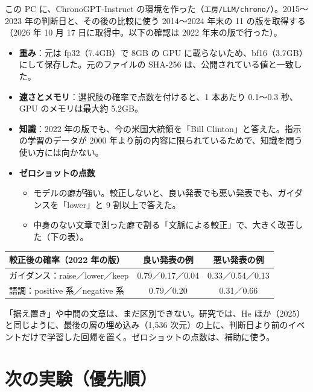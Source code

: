 \documentclass[xelatex,ja=standard,jafont=haranoaji,a4paper,10pt]{bxjsarticle}
\newcommand{\code}[1]{\texttt{#1}}
\begin{document}
この PC に、ChronoGPT-Instruct の環境を作った（\code{工房/LLM/chrono/}）。2015〜2023 年の判断日と、その後の比較に使う 2014〜2024 年末の 11 の版を取得する（2026 年 10 月 17 日に取得中。以下の確認は 2022 年末の版で行った）。

\begin{itemize}
\item \textbf{重み}：元は fp32（7.4GB）で 8GB の GPU に載らないため、bf16（3.7GB）にして保存した。元のファイルの SHA-256 は、公開されている値と一致した。
\item \textbf{速さとメモリ}：選択肢の確率で点数を付けると、1 本あたり 0.1〜0.3 秒、GPU のメモリは最大約 5.2GB。
\item \textbf{知識}：2022 年の版でも、今の米国大統領を「Bill Clinton」と答えた。指示の学習のデータが 2000 年より前の内容に限られているためで、知識を問う使い方には向かない。
\item \textbf{ゼロショットの点数}
  \begin{itemize}
  \item モデルの癖が強い。較正しないと、良い発表でも悪い発表でも、ガイダンスを「lower」と 9 割以上で答えた。
  \item 中身のない文章で測った癖で割る「文脈による較正」で、大きく改善した（下の表）。
  \end{itemize}
\end{itemize}

\begin{center}\small
\begin{tabular}{@{}lcc@{}}
\toprule
較正後の確率（2022 年の版） & 良い発表の例 & 悪い発表の例 \\
\midrule
ガイダンス：raise／lower／keep & 0.79／0.17／0.04 & 0.33／0.54／0.13 \\
語調：positive 系／negative 系 & 0.79／0.20 & 0.31／0.66 \\
\bottomrule
\end{tabular}
\end{center}

\noindent 「据え置き」や中間の文章は、まだ区別できない。研究では、He ほか（2025）と同じように、最後の層の埋め込み（1,536 次元）の上に、判断日より前のイベントだけで学習した回帰を置く。ゼロショットの点数は、補助に使う。

\section{次の実験（優先順）}
\end{document}
